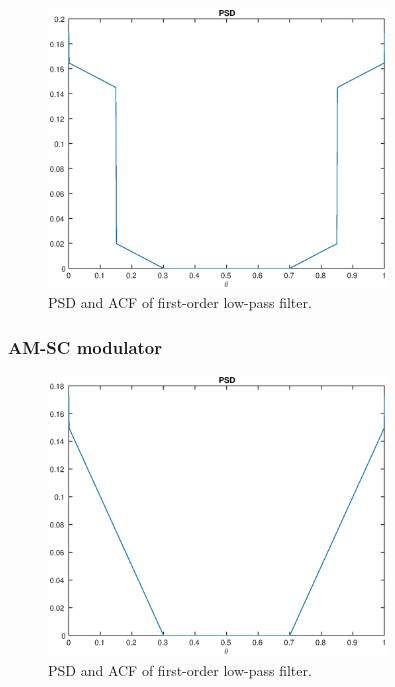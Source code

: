 \begin{figure}[h]
\centering
\includegraphics[width=0.8\textwidth]{bilder/Lab2/Lab2fig2.eps}
\caption{PSD and ACF of first-order low-pass filter.}
\label{fig:Lab1fig1}
\end{figure}

\subsubsection{AM-SC modulator}

\begin{figure}[h]
\centering
\includegraphics[width=0.8\textwidth]{bilder/Lab2/Lab2fig1.eps}
\caption{PSD and ACF of first-order low-pass filter.}
\label{fig:Lab1fig1}
\end{figure}



